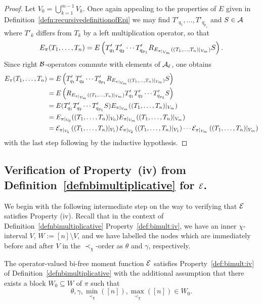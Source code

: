 \begin{proof}
	Let $V_0 = \bigcup^{m-1}_{k=1} V_k$.
	Once again appealing to the properties of $E$ given in Definition~\ref{defn:recursivedefinitionofEpi} we may find $T'_{q_1}, \ldots, T'_{q_{p_1}}$ and $S \in \mathcal{A}$ where $T'_k$ differs from $T_k$ by a left multiplication operator, so that
	\[
		E_\pi(T_1, \ldots, T_n) = E\left(T'_{q_1} T'_{q_2} \cdots T'_{q_{p_1}} R_{E_{\pi|_{V_m}}((T_1, \ldots, T_n)|_{V_m})} S\right). 
	\]
	Since right $\mathcal{B}$-operators commute with elements of $\mathcal{A}_\ell$, one obtains
	\begin{align*}
		E_\pi(T_1, \ldots, T_n) &=
		E\left(T'_{q_1} T'_{q_2} \cdots T'_{q_{p_1}} R_{E_{\pi|_{V_m}}((T_1, \ldots, T_n)|_{V_m})} S\right) \\
		&= E\left(R_{E_{\pi|_{V_m}}((T_1, \ldots, T_n)|_{V_m})}T'_{q_1} T'_{q_2} \cdots T'_{q_{p_1}}S \right) \\
		&= E(T'_{q_1} T'_{q_2} \cdots T'_{q_{p_1}}S) E_{\pi|_{V_m}}((T_1, \ldots, T_n)|_{V_m}) \\
		&=
		E_{\pi|_{V_0}}((T_1, \ldots, T_n)|_{V_0})E_{\pi|_{V_m}}((T_1, \ldots, T_n)|_{V_m})\\
		&= \mathcal{E}_{\pi|_{V_1}}\left((T_1, \ldots, T_n)|_{V_1}\right) \mathcal{E}_{\pi|_{V_2}}\left((T_1, \ldots, T_n)|_{V_1}\right) \cdots \mathcal{E}_{\pi|_{V_m}}\left((T_1, \ldots, T_n)|_{V_m}\right)
	\end{align*}
	with the last step following by the inductive hypothesis.
\end{proof}




\subsection{Verification of Property~(iv) from Definition~\ref{defnbimultiplicative} for $\mathcal{E}$.}


We begin with the following intermediate step on the way to verifying that $\mathcal{E}$ satisfies Property (iv).
Recall that in the context of Definition~\ref{defnbimultiplicative} Property~\ref{def:bimult:iv}, we have an inner $\chi$-interval $V$, $W := [n]\setminus V$, and we have labelled the nodes which are immediately before and after $V$ in the $\prec_\chi$-order as $\theta$ and $\gamma$, respectively.

\begin{lemma}
	\label{lemreductionofbimultiplicativeinsideablockforE}
	The operator-valued bi-free moment function $\mathcal{E}$ satisfies Property~\ref{def:bimult:iv} of Definition~\ref{defnbimultiplicative} with the additional assumption that there exists a block $W_0 \subseteq W$ of $\pi$ such that 
	\[
		\theta, \gamma, \min_{\prec_\chi}([n]),
		\max_{\prec_\chi}([n]) \in W_0.
	\]
\end{lemma}

